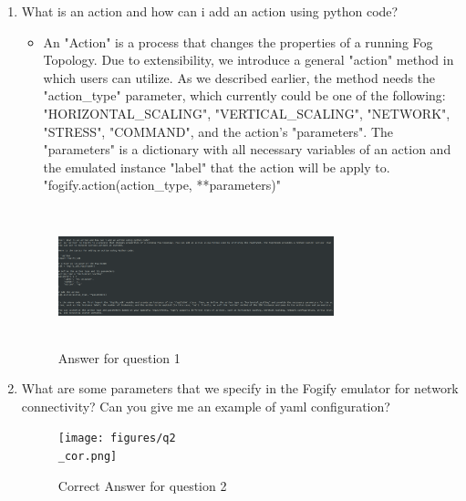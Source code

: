 \begin{enumerate}
    \item What is an action and how can i add an action using python code?
          \begin{itemize}
              \item An "Action" is a process that changes the properties of a
                    running Fog Topology. Due to extensibility, we introduce a
                    general
                    "action"
                    method in which users can utilize. As we described earlier,
                    the
                    method needs
                    the "action\_type" parameter, which currently could be one
                    of the
                    following:
                    "HORIZONTAL\_SCALING",
                    "VERTICAL\_SCALING", "NETWORK", "STRESS", "COMMAND", and
                    the action's "parameters". The "parameters" is a dictionary
                    with
                    all
                    necessary
                    variables of an action and the emulated instance "label"
                    that the
                    action will
                    be apply to.
                    "fogify.action(action\_type, **parameters)"
          \end{itemize}

          \begin{figure}[h!]
              \includegraphics[width=8cm,height=4cm]{figures/q1.png}
              \caption[Methodology pipline]{Answer for question 1}
              \label{img:q1}
          \end{figure}
    \item What are some parameters that we specify in the Fogify emulator for
          network connectivity? Can you give me an example of yaml
          configuration?
          \begin{figure}[h!]
              \texttt{[image: figures/q2\\\_cor.png]}
              \caption[Methodology pipline]{Correct Answer for question 2}
              \label{img:q2_cor}
          \end{figure}


\end{enumerate}
